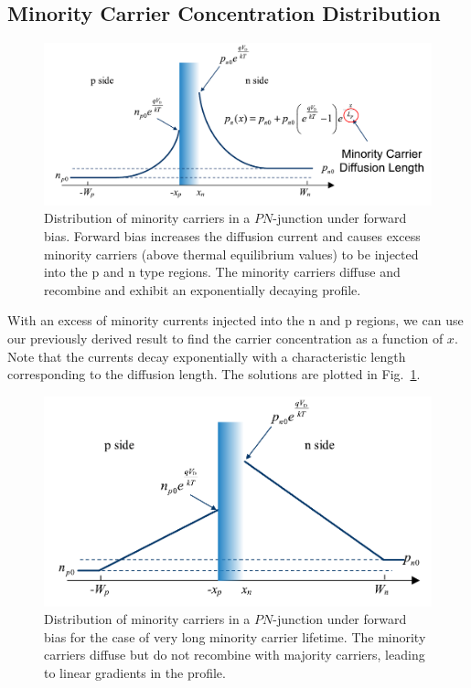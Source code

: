 \subsection{Minority Carrier Concentration Distribution}
\begin{figure}[tb]
\centering
\includegraphics[width=.75\columnwidth]{slide41}
\caption{Distribution of minority carriers in a $PN$-junction under forward bias.  Forward bias increases the diffusion current and causes excess minority carriers (above thermal equilibrium values) to be injected into the p and n type regions.  The minority carriers diffuse and recombine and exhibit an exponentially decaying profile.}
\label{fig:slide41}
\end{figure}
With an excess of minority currents injected into the n and p regions, we can use our previously derived result to find the carrier concentration as a function of $x$.  Note that the currents decay exponentially with a characteristic length corresponding to the diffusion length.  The solutions are plotted in Fig.~\ref{fig:slide41}.
\begin{figure}[tb]
\centering
\includegraphics[width=.75\columnwidth]{slide42}
\caption{Distribution of minority carriers in a $PN$-junction under forward bias for the case of very long minority carrier lifetime.  The minority carriers diffuse but do not recombine with majority carriers, leading to linear gradients in the profile.}
\label{fig:slide42}
\end{figure}
